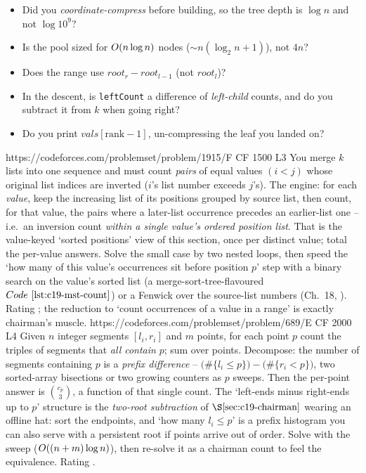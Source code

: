 \begin{stuckbox}
\begin{itemize}[nosep,leftmargin=1.4em]
  \item Did you \emph{coordinate-compress} before building, so the tree depth is \(\log n\) and not \(\log 10^9\)?
  \item Is the pool sized for \(O(n\log n)\) nodes (\(\sim n(\log_2 n+1)\)), not \(4n\)?
  \item Does the range use \(\mathit{root}_r-\mathit{root}_{l-1}\) (not \(\mathit{root}_l\))?
  \item In the descent, is \texttt{leftCount} a difference of \emph{left-child} counts, and do you subtract it from \(k\) when going right?
  \item Do you print \(\mathit{vals}[\text{rank}-1]\), un-compressing the leaf you landed on?
\end{itemize}
\end{stuckbox}

\begin{practiceset}
    {https://codeforces.com/problemset/problem/1915/F}
    {CF 1500 L3}
    {You merge \(k\) lists into one sequence and must count \emph{pairs} of equal values \((i<j)\) whose original list indices are inverted (\(i\)'s list number exceeds \(j\)'s). The engine: for each \emph{value}, keep the increasing list of its positions grouped by source list, then count, for that value, the pairs where a later-list occurrence precedes an earlier-list one -- i.e.\ an inversion count \emph{within a single value's ordered position list}. That is the value-keyed `sorted positions' view of this section, once per distinct value; total the per-value answers. Solve the small case by two nested loops, then speed the `how many of this value's occurrences sit before position \(p\)' step with a binary search on the value's sorted list (a merge-sort-tree-flavoured \(\coderef{c19-mst-count}\)) or a Fenwick over the source-list numbers (Ch.~18, ). Rating ; the reduction to `count occurrences of a value in a range' is exactly chairman's muscle.}
    {https://codeforces.com/problemset/problem/689/E}
    {CF 2000 L4}
    {Given \(n\) integer segments \([l_i,r_i]\) and \(m\) points, for each point \(p\) count the triples of segments that \emph{all contain} \(p\); sum over points. Decompose: the number of segments containing \(p\) is a \emph{prefix difference} -- \(\bigl(\#\{l_i\le p\}\bigr)-\bigl(\#\{r_i<p\}\bigr)\), two sorted-array bisections or two growing counters as \(p\) sweeps. Then the per-point answer is \(\binom{c_p}{3}\), a function of that single count. The `left-ends minus right-ends up to \(p\)' structure is the \emph{two-root subtraction} of \(\secref{c19-chairman}\) wearing an offline hat: sort the endpoints, and `how many \(l_i\le p\)' is a prefix histogram you can also serve with a persistent root if points arrive out of order. Solve with the sweep (\(O((n+m)\log n)\)), then re-solve it as a chairman count to feel the equivalence. Rating .}
\end{practiceset}

